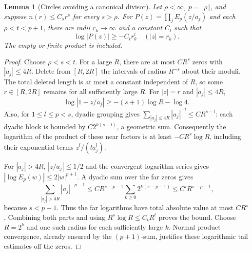 \documentclass[11pt,a4paper,openany]{book}
\newtheorem{lemma}[theorem]{Lemma}
\theoremstyle{definition}
\theoremstyle{remark}\newtheorem{remark}[theorem]{Remark}
\begin{document}
\begin{lemma}[Circles avoiding a canonical divisor]\label{d12:17:lower-product}
Let $\rho<\infty$, $p=\lfloor\rho\rfloor$, and suppose
$n(r)\le C_s r^s$ for every $s>\rho$. For
$P(z)=\prod_jE_p(z/a_j)$ and each $\rho<t<p+1$, there are radii
$r_k\to\infty$ and a constant $C_t$ such that
\[
                   \log|P(z)|\ge-C_t r_k^t\quad (|z|=r_k).
\]
The empty or finite product is included.
\end{lemma}
\begin{proof}
Choose $\rho<s<t$. For a large $R$, there are at most $C R^s$ zeros
with $|a_j|\le4R$. Delete from $[R,2R]$ the intervals of radius
$R^{-s}$ about their moduli. The total deleted length is at most a
constant independent of $R$, so some $r\in[R,2R]$ remains for all
sufficiently large $R$. For $|z|=r$ and $|a_j|\le4R$,
\[
 \log|1-z/a_j|\ge-(s+1)\log R-\log4.
\]
Also, for $1\le l\le p<s$, dyadic grouping gives
$\sum_{|a_j|\le4R}|a_j|^{-l}\le C R^{s-l}$: each dyadic block is
bounded by $C2^{k(s-l)}$, a geometric sum. Consequently the logarithm
of the product of these near factors is at least $-C R^s\log R$,
including their exponential terms $z^l/(l a_j^l)$.

For $|a_j|>4R$, $|z/a_j|\le1/2$ and the convergent logarithm series
gives $|\log E_p(w)|\le2|w|^{p+1}$. A dyadic sum over the far zeros
gives
\[
 \sum_{|a_j|>4R}|a_j|^{-p-1}
 \le C R^{s-p-1}\sum_{k\ge0}2^{k(s-p-1)}
 \le C'R^{s-p-1},
\]
because $s<p+1$. Thus the far logarithms have total absolute value at
most $C R^s$. Combining both parts and using
$R^s\log R\le C_tR^t$ proves the bound. Choose $R=2^k$ and one such
radius for each sufficiently large $k$. Normal product convergence,
already ensured by the $(p+1)$-sum, justifies these logarithmic tail
estimates off the zeros.
\end{proof}
\end{document}

